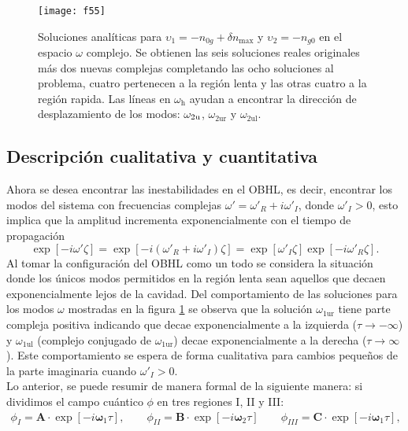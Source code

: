 \begin{figure}\centering
	\texttt{[image: f55]}
	\caption{Soluciones analíticas para $\upsilon_1=-n_{0g}+\delta n_{\text{max}}$ y $\upsilon_2=-n_{g0}$ en el espacio $\omega$ complejo. Se obtienen las seis soluciones reales originales más dos nuevas complejas completando las ocho soluciones al problema, cuatro pertenecen a la regi\'{o}n lenta y las otras cuatro a la regi\'{o}n rapida. Las líneas en $\omega_{\text{h}}$ ayudan a encontrar la dirección de desplazamiento de los modos: $\omega_{\text{\text{2u}}}$, $\omega_{\text{2ur}}$ y $\omega_{\text{2ul}}$.}\label{fig:5.5}
\end{figure}



\subsection{Descripci\'{o}n cualitativa y cuantitativa}
Ahora se desea encontrar las inestabilidades en el OBHL, es decir, encontrar los modos del sistema con frecuencias complejas $\omega'=\omega'_R+i\omega'_I$, donde $\omega'_I>0$, esto implica que la amplitud incrementa exponencialmente con el tiempo de propagaci\'{o}n
\begin{equation}
\exp[-i\omega' \zeta]=\exp[-i(\omega'_R+i\omega'_I)\zeta]=\exp[\omega'_I\zeta]\exp[-i\omega'_R\zeta].
\end{equation}
Al tomar la configuraci\'{o}n del OBHL como un todo se considera la situación donde los únicos modos permitidos en la regi\'{o}n lenta sean aquellos que decaen exponencialmente lejos de la cavidad. Del comportamiento de las soluciones para los modos $\omega$ mostradas en la figura \ref{fig:5.5} se observa que la soluci\'{o}n $\omega_{\text{1ur}}$ tiene parte compleja positiva indicando que decae exponencialmente a la izquierda ($\tau\rightarrow -\infty$) y $\omega_{\text{1ul}}$ (complejo conjugado de $\omega_{\text{1ur}}$) decae exponencialmente a la derecha  ($\tau \rightarrow \infty$). Este comportamiento se espera de forma cualitativa para cambios peque\~{n}os de la parte imaginaria cuando $\omega'_I>0$.\\

Lo anterior, se puede resumir de manera formal de la siguiente manera: si dividimos el campo cu\'{a}ntico $\phi$ en tres regiones I, II y III:
\begin{align}
\phi_I=\textbf{A}\cdot \exp[-i{\bm{\omega}}_1\tau],\qquad \phi_{II}=\textbf{B}\cdot \exp[-i{\bm{\omega}}_2\tau]\qquad\phi_{III}=\textbf{C}\cdot \exp[-i{\bm{\omega}}_1\tau],
\end{align}

